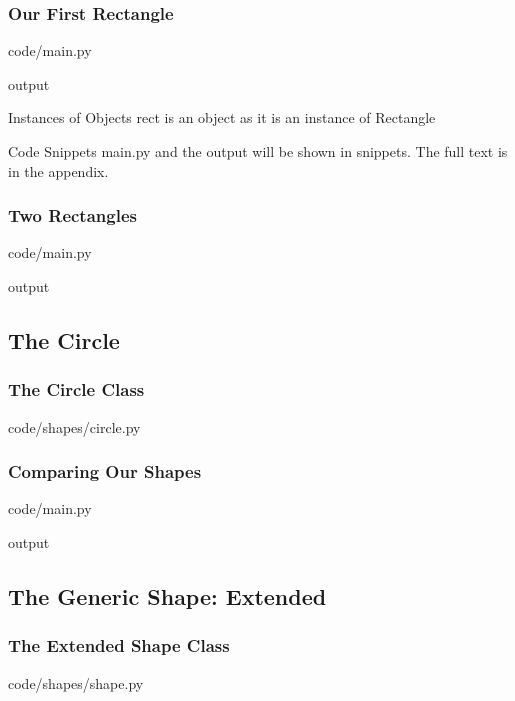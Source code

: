 \documentclass{beamer}
\newcommand{\closenewline}{%
  \par\nopagebreak
  \vspace{-\itemsep}
  \vspace{-\parsep}
}
\begin{document}
  \begin{frame}
    \frametitle{Our First Rectangle}

    code/main.py
    

    output
    
    \begin{block}{Instances of Objects}
      rect is an object as it is an instance of Rectangle 
    \end{block}

    \begin{block}{Code Snippets}
      main.py and the output will be shown in snippets.
      The full text is in the appendix.
    \end{block}
  \end{frame}

  \begin{frame}
    \frametitle{Two Rectangles}

    code/main.py
    

    output
    
  \end{frame}


\subsection{The Circle}
  \begin{frame}
    \frametitle{The Circle Class}
    code/shapes/circle.py
    
  \end{frame}

  \begin{frame}
    \frametitle{Comparing Our Shapes}

    code/main.py
    
    \closenewline
    

    output
    
    \closenewline
    
  \end{frame}

\subsection{The Generic Shape: Extended}
  \begin{frame}
    \frametitle{The Extended Shape Class}
    code/shapes/shape.py
    
  \end{frame}
\end{document}
